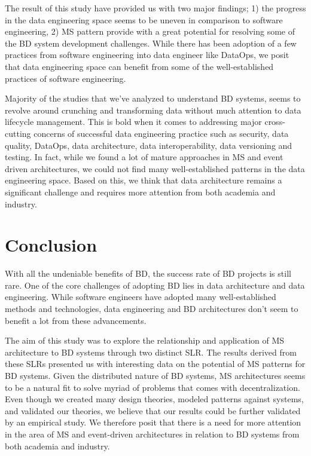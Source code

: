 \documentclass[a4paper,11pt,article,oneside]{memoir}
\begin{document}
The result of this study have provided us with two major findings; 1) the progress in the data engineering space seems to be uneven in comparison to software engineering, 2) MS pattern provide with a great potential for resolving some of the BD system development challenges. While there has been adoption of a few practices from software engineering into data engineer like DataOps, we posit that data engineering space can benefit from some of the well-established practices of software engineering. 

Majority of the studies that we've analyzed to understand BD systems, seems to revolve around crunching and transforming data without much attention to data lifecycle management. This is bold when it comes to addressing major cross-cutting concerns of successful data engineering practice such as security, data quality, DataOps, data architecture, data interoperability, data versioning and testing. In fact, while we found a lot of mature approaches in MS and event driven architectures, we could not find many well-established patterns in the data engineering space. Based on this, we think that data architecture remains a significant challenge and requires more attention from both academia and industry. 





\chapter{Conclusion}

With all the undeniable benefits of BD, the success rate of BD projects is still rare. One of the core challenges of adopting BD lies in data architecture and data engineering. While software engineers have adopted many well-established methods and technologies, data engineering and BD architectures don't seem to benefit a lot from these advancements. 

The aim of this study was to explore the relationship and application of MS architecture to BD systems through two distinct SLR. The results derived from these SLRs presented us with interesting data on the potential of MS patterns for BD systems. Given the distributed nature of BD systems, MS architectures seems to be a natural fit to solve myriad of problems that comes with decentralization. Even though we created many design theories, modeled patterns against systems, and validated our theories, we believe that our results could be further validated by an empirical study. We therefore posit that there is a need for more attention in the area of MS and event-driven architectures in relation to BD systems from both academia and industry. 





\printbibliography
\end{document}
